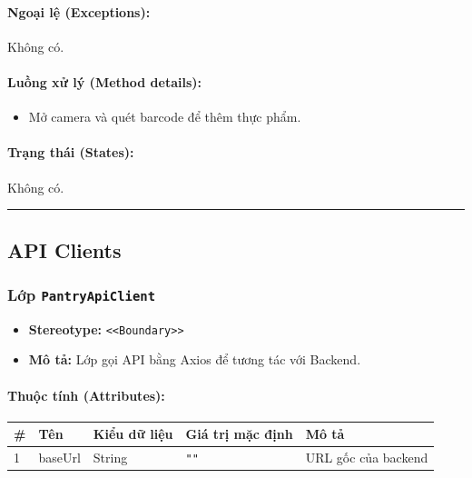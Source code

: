 \documentclass[12pt,a4paper]{article}
\begin{document}
\paragraph{Ngoại lệ (Exceptions):}
Không có.

\paragraph{Luồng xử lý (Method details):}
\begin{itemize}[leftmargin=*]
    \item Mở camera và quét barcode để thêm thực phẩm.
\end{itemize}


\paragraph{Trạng thái (States):}
Không có.

\vskip 0.5cm
\noindent\rule{\textwidth}{0.5pt}
\vskip 0.5cm

\subsection{API Clients}


\subsubsection{Lớp \texttt{PantryApiClient}}

\begin{itemize}[leftmargin=*]
    \item \textbf{Stereotype:} \texttt{\textless{}\textless{}Boundary\textgreater{}\textgreater{}}
    \item \textbf{Mô tả:} Lớp gọi API bằng Axios để tương tác với Backend.
\end{itemize}

\paragraph{Thuộc tính (Attributes):}
\begin{longtable}{|p{0.6cm}|p{3.5cm}|p{2.4cm}|p{1.8cm}|p{5.1cm}|}
\hline
\textbf{\#} & \textbf{Tên} & \textbf{Kiểu dữ liệu} & \textbf{Giá trị mặc định} & \textbf{Mô tả} \\ \hline
\endhead
1 & baseUrl & String & \texttt{""} & URL gốc của backend \\ \hline
\end{longtable}
\end{document}
